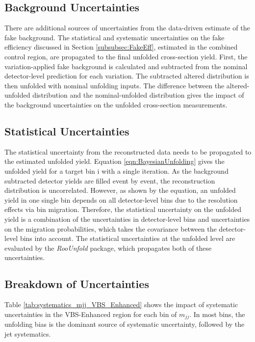 \begin{itemize}
{    }
\end{itemize}

\subsection{Background Uncertainties}
\label{subsec:BkgUnc}
There are additional sources of uncertainties from the data-driven estimate of the fake background. The statistical and systematic uncertainties on the fake efficiency discussed in Section \ref{subsubsec:FakeEff}, estimated in the combined control region, are propagated to the final unfolded cross-section yield. First, the variation-applied fake background is calculated and subtracted from the nominal detector-level prediction for each variation. The subtracted altered distribution is then unfolded with nominal unfolding inputs. The difference between the altered-unfolded distribution and the nominal-unfolded distribution gives the impact of the background uncertainties on the unfolded cross-section measurements.

\subsection{Statistical Uncertainties}
\label{subsubsec:StatUnc}
The statistical uncertainty from the reconstructed data needs to be propagated to the estimated unfolded yield. Equation \ref{eqn:BayesianUnfolding} gives the unfolded yield for a target bin i with a single iteration. As the background subtracted detector yields are filled event by event, the reconstruction distribution is uncorrelated. However, as shown by the equation, an unfolded yield in one single bin depends on all detector-level bins due to the resolution effects via bin migration. Therefore, the statistical uncertainty on the unfolded yield is a combination of the uncertainties in detector-level bins and uncertainties on the migration probabilities, which takes the covariance between the detector-level bins into account. The statistical uncertainties at the unfolded level are evaluated by the \textit{RooUnfold} package, which propagates both of these uncertainties.

\subsection{Breakdown of Uncertainties }
\label{subsec:SysUncBreakdown}
Table \ref{tab:systematics_mjj_VBS_Enhanced} shows the impact of systematic uncertainties in the VBS-Enhanced region for each bin of $m_{jj}$. In most bins, the unfolding bias is the dominant source of systematic uncertainty, followed by the jet systematics. 

